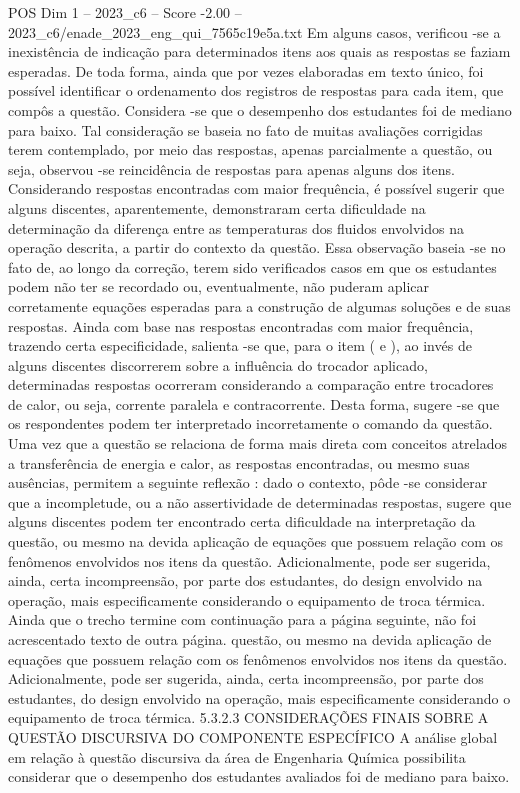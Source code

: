 \begin{textsample}{POS Dim 1 – 2023\_c6 – Score -2.00 – 2023\_c6/enade\_2023\_eng\_qui\_7565c19e5a.txt}
Em alguns casos, verificou -se a inexistência de indicação para determinados itens aos quais as respostas se faziam esperadas.
De toda forma, ainda que por vezes elaboradas em texto único, foi possível identificar o ordenamento dos registros de respostas para cada item, que compôs a questão.
Considera -se que o desempenho dos estudantes foi de mediano para baixo.
Tal consideração se baseia no fato de muitas avaliações corrigidas terem contemplado, por meio das respostas, apenas parcialmente a questão, ou seja, observou -se reincidência de respostas para apenas alguns dos itens.
Considerando respostas encontradas com maior frequência, é possível sugerir que alguns discentes, aparentemente, demonstraram certa dificuldade na determinação da diferença entre as temperaturas dos fluidos envolvidos na operação descrita, a partir do contexto da questão.
Essa observação baseia -se no fato de, ao longo da correção, terem sido verificados casos em que os estudantes podem não ter se recordado ou, eventualmente, não puderam aplicar corretamente equações esperadas para a construção de algumas soluções e de suas respostas.
Ainda com base nas respostas encontradas com maior frequência, trazendo certa especificidade, salienta -se que, para o item ( e ), ao invés de alguns discentes discorrerem sobre a influência do trocador aplicado, determinadas respostas ocorreram considerando a comparação entre trocadores de calor, ou seja, corrente paralela e contracorrente.
Desta forma, sugere -se que os respondentes podem ter interpretado incorretamente o comando da questão.
Uma vez que a questão se relaciona de forma mais direta com conceitos atrelados a transferência de energia e calor, as respostas encontradas, ou mesmo suas ausências, permitem a seguinte reflexão : dado o contexto, pôde -se considerar que a incompletude, ou a não assertividade de determinadas respostas, sugere que alguns discentes podem ter encontrado certa dificuldade na interpretação da questão, ou mesmo na devida aplicação de equações que possuem relação com os fenômenos envolvidos nos itens da questão.
Adicionalmente, pode ser sugerida, ainda, certa incompreensão, por parte dos estudantes, do design envolvido na operação, mais especificamente considerando o equipamento de troca térmica.
Ainda que o trecho termine com continuação para a página seguinte, não foi acrescentado texto de outra página. questão, ou mesmo na devida aplicação de equações que possuem relação com os fenômenos envolvidos nos itens da questão.
Adicionalmente, pode ser sugerida, ainda, certa incompreensão, por parte dos estudantes, do design envolvido na operação, mais especificamente considerando o equipamento de troca térmica. 5.3.2.3 CONSIDERAÇÕES FINAIS SOBRE A QUESTÃO DISCURSIVA DO COMPONENTE ESPECÍFICO A análise global em relação à questão discursiva da área de Engenharia Química possibilita considerar que o desempenho dos estudantes avaliados foi de mediano para baixo.

\end{textsample}
